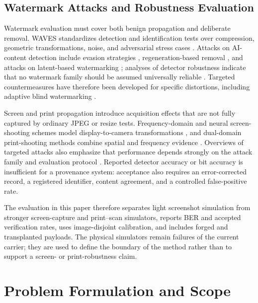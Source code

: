 \documentclass[a4paper,fleqn]{cas-sc}
\begin{document}
\subsection{Watermark Attacks and Robustness Evaluation}
Watermark evaluation must cover both benign propagation and deliberate removal.
WAVES standardizes detection and identification tests over compression,
geometric transformations, noise, and adversarial stress cases
\cite{an_waves_2024}. Attacks on AI-content detection include evasion strategies
\cite{jiang_evading_2023}, regeneration-based removal
\cite{zhao_invisible_2024}, and attacks on latent-based watermarking
\cite{lee_removal_2025}; analyses of detector robustness indicate that no
watermark family should be assumed universally reliable
\cite{saberi_robustness_2024}. Targeted countermeasures have therefore been
developed for specific distortions, including adaptive blind
watermarking \cite{hsu_ai-assisted_2024}.

Screen and print propagation introduce acquisition effects that are not fully
captured by ordinary JPEG or resize tests. Frequency-domain and neural
screen-shooting schemes model display-to-camera transformations
\cite{cao_screen-shooting_2023,peng_screen-shooting_2025}, and dual-domain
print-shooting methods combine spatial and frequency evidence
\cite{yan_dual-domain_2026}. Overviews of targeted attacks also emphasize that
performance depends strongly on the attack family and evaluation protocol
\cite{melman_methods_2024}. Reported detector accuracy or bit accuracy is
insufficient for a provenance system: acceptance also requires an error-corrected
record, a registered identifier, content agreement, and a controlled
false-positive rate.

The evaluation in this paper therefore separates light screenshot simulation
from stronger screen-capture and print--scan simulators, reports BER and
accepted verification rates, uses image-disjoint calibration, and includes
forged and transplanted payloads. The physical simulators remain failures of
the current carrier; they are used to define the boundary of the method rather
than to support a screen- or print-robustness claim.

\section{Problem Formulation and Scope}\label{sec:problem}
\end{document}
